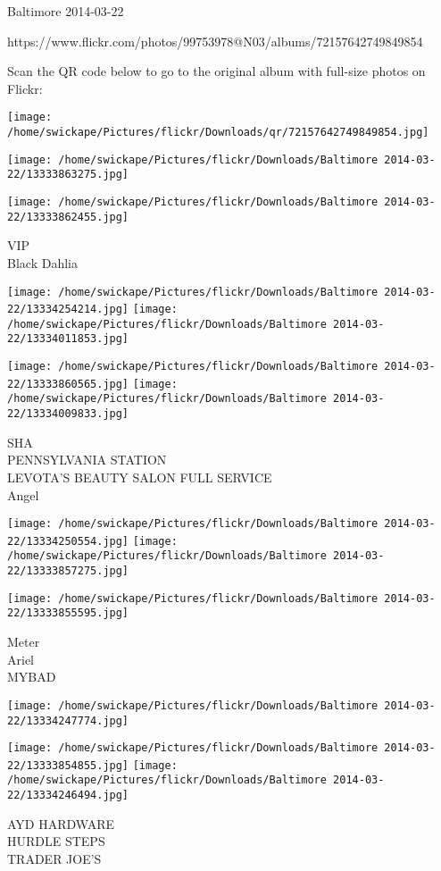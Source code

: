 \documentclass[10pt,letterpaper]{article}
\begin{document}
Baltimore 2014-03-22

https://www.flickr.com/photos/99753978@N03/albums/72157642749849854

Scan the QR code below to go to the original album with full-size photos on Flickr:

\texttt{[image: /home/swickape/Pictures/flickr/Downloads/qr/72157642749849854.jpg]}
\pagebreak

\texttt{[image: /home/swickape/Pictures/flickr/Downloads/Baltimore 2014-03-22/13333863275.jpg]}

\vspace{0.25in}
\texttt{[image: /home/swickape/Pictures/flickr/Downloads/Baltimore 2014-03-22/13333862455.jpg]}

VIP\\
Black Dahlia\\
\pagebreak

\texttt{[image: /home/swickape/Pictures/flickr/Downloads/Baltimore 2014-03-22/13334254214.jpg]}
\texttt{[image: /home/swickape/Pictures/flickr/Downloads/Baltimore 2014-03-22/13334011853.jpg]}

\texttt{[image: /home/swickape/Pictures/flickr/Downloads/Baltimore 2014-03-22/13333860565.jpg]}
\texttt{[image: /home/swickape/Pictures/flickr/Downloads/Baltimore 2014-03-22/13334009833.jpg]}

SHA\\
PENNSYLVANIA STATION\\
LEVOTA'S BEAUTY SALON FULL SERVICE\\
Angel\\
\pagebreak

\texttt{[image: /home/swickape/Pictures/flickr/Downloads/Baltimore 2014-03-22/13334250554.jpg]}
\texttt{[image: /home/swickape/Pictures/flickr/Downloads/Baltimore 2014-03-22/13333857275.jpg]}

\texttt{[image: /home/swickape/Pictures/flickr/Downloads/Baltimore 2014-03-22/13333855595.jpg]}

Meter\\
Ariel\\
MYBAD\\
\pagebreak

\texttt{[image: /home/swickape/Pictures/flickr/Downloads/Baltimore 2014-03-22/13334247774.jpg]}

\vspace{0.25in}
\texttt{[image: /home/swickape/Pictures/flickr/Downloads/Baltimore 2014-03-22/13333854855.jpg]}
\texttt{[image: /home/swickape/Pictures/flickr/Downloads/Baltimore 2014-03-22/13334246494.jpg]}

AYD HARDWARE\\
HURDLE STEPS\\
TRADER JOE'S\\
\pagebreak
\end{document}
